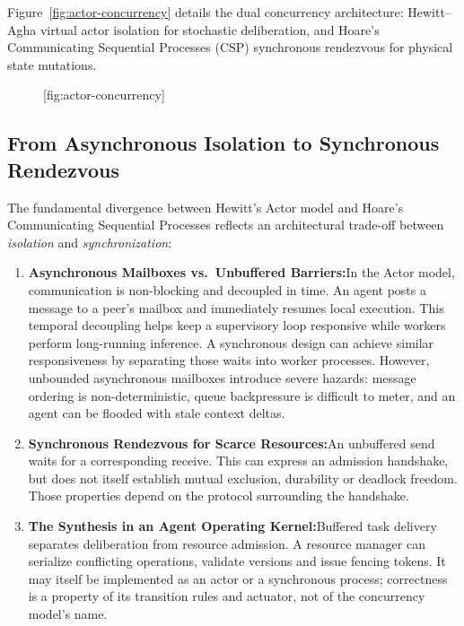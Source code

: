 \documentclass[11pt,a4paper]{article}
\begin{document}
Figure~\ref{fig:actor-concurrency} details the dual concurrency architecture: Hewitt--Agha virtual actor isolation for stochastic deliberation, and Hoare's Communicating Sequential Processes (CSP) synchronous rendezvous for physical state mutations.

\begin{figure}[tp]
  \centering
  [fig:actor-concurrency]
\end{figure}

\subsection{From Asynchronous Isolation to Synchronous Rendezvous}

The fundamental divergence between Hewitt's Actor model and Hoare's Communicating Sequential Processes reflects an architectural trade-off between \emph{isolation} and \emph{synchronization}:

\begin{enumerate}[leftmargin=1.8em,itemsep=3pt]
  \item \textbf{Asynchronous Mailboxes vs.\ Unbuffered Barriers:}\enspace In the Actor model, communication is non-blocking and decoupled in time. An agent posts a message to a peer's mailbox and immediately resumes local execution. This temporal decoupling helps keep a supervisory loop responsive while workers perform long-running inference. A synchronous design can achieve similar responsiveness by separating those waits into worker processes. However, unbounded asynchronous mailboxes introduce severe hazards: message ordering is non-deterministic, queue backpressure is difficult to meter, and an agent can be flooded with stale context deltas.
  
  \item \textbf{Synchronous Rendezvous for Scarce Resources:}\enspace An unbuffered send waits for a corresponding receive. This can express an admission handshake, but does not itself establish mutual exclusion, durability or deadlock freedom. Those properties depend on the protocol surrounding the handshake.

  \item \textbf{The Synthesis in an Agent Operating Kernel:}\enspace Buffered task delivery separates deliberation from resource admission. A resource manager can serialize conflicting operations, validate versions and issue fencing tokens. It may itself be implemented as an actor or a synchronous process; correctness is a property of its transition rules and actuator, not of the concurrency model's name.
\end{enumerate}
\end{document}

